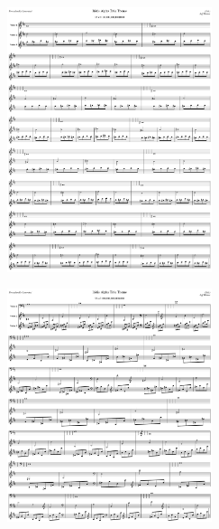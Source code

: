 \begin{figure}[H]                                             
{                                                             
  \setlength{\tabcolsep}{3.0pt}                               
  \setlength\cmidrulewidth{\heavyrulewidth} %
    \begin{subfigure}{0.5\textwidth}                            
  \includegraphics[width=6cm]{music/title_no_55_page_1001.png}%
    \end{subfigure}                                             
  \begin{subfigure}{0.5\textwidth}                            
  \includegraphics[width=6cm]{music/title_no_56_page_1001.png}%
    \end{subfigure}                                             
}                                                             
\end{figure}                                                  


